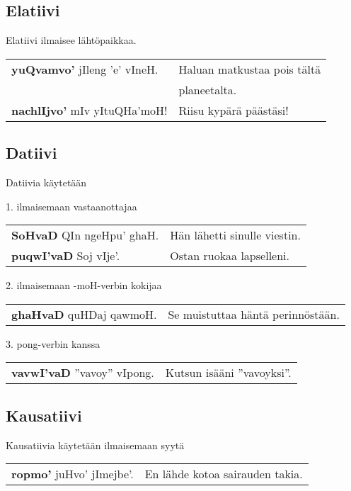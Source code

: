 \documentclass{book}
\begin{document}
\subsection{Elatiivi}

Elatiivi ilmaisee lähtöpaikkaa.

\begin{tabular}{l l}
    \textbf{yuQvamvo'} jIleng 'e' vIneH. & Haluan matkustaa pois tältä \\
    & planeetalta. \\
    \textbf{nachlIjvo'} mIv yItuQHa'moH! & Riisu kypärä päästäsi! \\
\end{tabular}

\subsection{Datiivi}

Datiivia käytetään

1. ilmaisemaan vastaanottajaa

\begin{tabular}{l l}
    \textbf{SoHvaD} QIn ngeHpu' ghaH. & Hän lähetti sinulle viestin. \\
    \textbf{puqwI'vaD} Soj vIje'. & Ostan ruokaa lapselleni. \\
\end{tabular}

2. ilmaisemaan -moH-verbin kokijaa

\begin{tabular}{l l}
    \textbf{ghaHvaD} quHDaj qawmoH. & Se muistuttaa häntä perinnöstään. \\
\end{tabular}

3. pong-verbin kanssa

\begin{tabular}{l l}
    \textbf{vavwI'vaD} ''vavoy'' vIpong. & Kutsun isääni ''vavoyksi''. \\
\end{tabular}

\subsection{Kausatiivi}

Kausatiivia käytetään ilmaisemaan syytä

\begin{tabular}{l l}
    \textbf{ropmo'} juHvo' jImejbe'. & En lähde kotoa sairauden takia. \\
\end{tabular}
\end{document}

